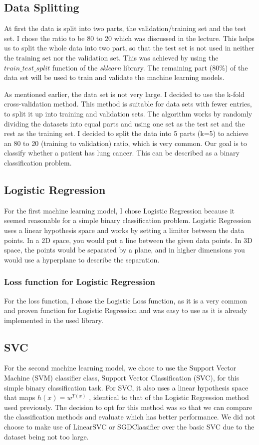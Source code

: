 \documentclass[a4paper,12pt]{article}
\begin{document}
\subsection{Data Splitting}
\label{sec:org9fbb41e}
At first the data is split into two parts, the validation/training set and the test set. I chose the ratio to be 80 to 20 which was discussed in the lecture.
This helps us to split the whole data into two part, so that the test set is not used in neither the training set nor the validation set.
This was achieved by using the \(train\_test\_split\) function of the \emph{sklearn} library.
The remaining part (80\%) of the data set will be used to train and validate the machine learning models.

As mentioned earlier, the data set is not very large.
I decided to use the k-fold cross-validation method. This method is suitable for data sets with fewer entries, to split it up into training and validation sets.
The algorithm works by randomly dividing the datasets into equal parts and using one set as the test set and the rest as the training set.
I decided to split the data into 5 parts (k=5) to achieve an 80 to 20 (training to validation) ratio, which is very common.
Our goal is to classify whether a patient has lung cancer. This can be described as a binary classification problem.

\subsection{Logistic Regression}
\label{sec:orgce0f90d}
For the first machine learning model, I chose Logistic Regression because it seemed reasonable for a simple binary classification problem.
Logistic Regression uses a linear hypothesis space and works by setting a limiter between the data points.
In a 2D space, you would put a line between the given data points. In 3D space, the points would be separated by a plane, and in higher dimensions you would use a hyperplane to describe the separation.

\subsubsection{Loss function for Logistic Regression}
\label{sec:org3ee9c68}
For the loss function, I chose the Logistic Loss function, as it is a very common and proven function for Logistic Regression and was easy to use as it is already implemented in the used library.

\subsection{SVC}
\label{sec:org65de79a}
For the second machine learning model, we chose to use the Support Vector Machine (SVM) classifier class, Support Vector Classification (SVC), for this simple binary classification task. For SVC, it also uses a linear hypothesis space that maps \(h(x) = w^{T(x)}\) , identical to that of the Logistic Regression method used previously. The decision to opt for this method was so that we can compare the classification methods and evaluate which has better performance. We did not choose to make use of LinearSVC or SGDClassifier over the basic SVC due to the dataset being not too large.
\end{document}
